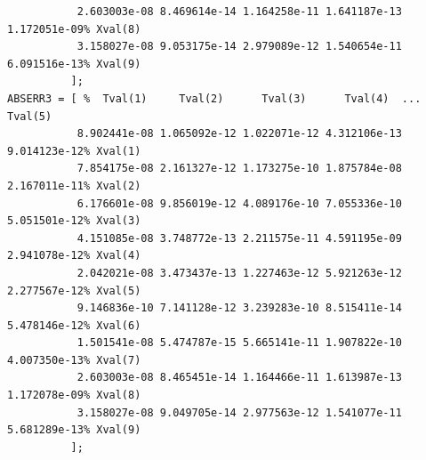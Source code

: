 \documentclass[a4paper,10pt]{report}%
\begin{document}
\begin{lstlisting}
           2.603003e-08 8.469614e-14 1.164258e-11 1.641187e-13 1.172051e-09% Xval(8)
           3.158027e-08 9.053175e-14 2.979089e-12 1.540654e-11 6.091516e-13% Xval(9)
          ];
ABSERR3 = [ %  Tval(1)     Tval(2)      Tval(3)      Tval(4)  ... Tval(5)
           8.902441e-08 1.065092e-12 1.022071e-12 4.312106e-13 9.014123e-12% Xval(1)
           7.854175e-08 2.161327e-12 1.173275e-10 1.875784e-08 2.167011e-11% Xval(2)
           6.176601e-08 9.856019e-12 4.089176e-10 7.055336e-10 5.051501e-12% Xval(3)
           4.151085e-08 3.748772e-13 2.211575e-11 4.591195e-09 2.941078e-12% Xval(4)
           2.042021e-08 3.473437e-13 1.227463e-12 5.921263e-12 2.277567e-12% Xval(5)
           9.146836e-10 7.141128e-12 3.239283e-10 8.515411e-14 5.478146e-12% Xval(6)
           1.501541e-08 5.474787e-15 5.665141e-11 1.907822e-10 4.007350e-13% Xval(7)
           2.603003e-08 8.465451e-14 1.164466e-11 1.613987e-13 1.172078e-09% Xval(8)
           3.158027e-08 9.049705e-14 2.977563e-12 1.541077e-11 5.681289e-13% Xval(9)
          ];
\end{lstlisting}
\end{document}
